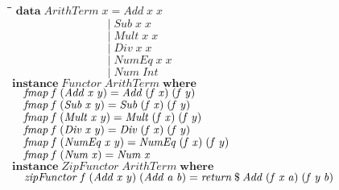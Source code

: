 \documentclass[10pt]{article}
\newlength{\lwidth}\setlength{\lwidth}{4.5cm}
\newlength{\cwidth}\setlength{\cwidth}{8mm} %
\newcommand{\Conid}[1]{\mathit{#1}}
\newcommand{\Varid}[1]{\mathit{#1}}
\begin{document}
\begin{tabbing}
\qquad\=\hspace{\lwidth}\=\hspace{\cwidth}\=\+\kill
${\mathbf{data}\;\Conid{ArithTerm}\;\Varid{x}\mathrel{=}\Conid{Add}\;\Varid{x}\;\Varid{x}}$\\
${\phantom{\mathbf{data}\;\Conid{ArithTerm}\;\Varid{x}\mbox{}}\mid \Conid{Sub}\;\Varid{x}\;\Varid{x}}$\\
${\phantom{\mathbf{data}\;\Conid{ArithTerm}\;\Varid{x}\mbox{}}\mid \Conid{Mult}\;\Varid{x}\;\Varid{x}}$\\
${\phantom{\mathbf{data}\;\Conid{ArithTerm}\;\Varid{x}\mbox{}}\mid \Conid{Div}\;\Varid{x}\;\Varid{x}}$\\
${\phantom{\mathbf{data}\;\Conid{ArithTerm}\;\Varid{x}\mbox{}}\mid \Conid{NumEq}\;\Varid{x}\;\Varid{x}}$\\
${\phantom{\mathbf{data}\;\Conid{ArithTerm}\;\Varid{x}\mbox{}}\mid \Conid{Num}\;\Conid{Int}}$\\
${}$\\
${\mathbf{instance}\;\Conid{Functor}\;\Conid{ArithTerm}\;\mathbf{where}}$\\
${\hskip1.00em\relax\Varid{fmap}\;\Varid{f}\;(\Conid{Add}\;\Varid{x}\;\Varid{y})\mathrel{=}\Conid{Add}\;(\Varid{f}\;\Varid{x})\;(\Varid{f}\;\Varid{y})}$\\
${\hskip1.00em\relax\Varid{fmap}\;\Varid{f}\;(\Conid{Sub}\;\Varid{x}\;\Varid{y})\mathrel{=}\Conid{Sub}\;(\Varid{f}\;\Varid{x})\;(\Varid{f}\;\Varid{y})}$\\
${\hskip1.00em\relax\Varid{fmap}\;\Varid{f}\;(\Conid{Mult}\;\Varid{x}\;\Varid{y})\mathrel{=}\Conid{Mult}\;(\Varid{f}\;\Varid{x})\;(\Varid{f}\;\Varid{y})}$\\
${\hskip1.00em\relax\Varid{fmap}\;\Varid{f}\;(\Conid{Div}\;\Varid{x}\;\Varid{y})\mathrel{=}\Conid{Div}\;(\Varid{f}\;\Varid{x})\;(\Varid{f}\;\Varid{y})}$\\
${\hskip1.00em\relax\Varid{fmap}\;\Varid{f}\;(\Conid{NumEq}\;\Varid{x}\;\Varid{y})\mathrel{=}\Conid{NumEq}\;(\Varid{f}\;\Varid{x})\;(\Varid{f}\;\Varid{y})}$\\
${\hskip1.00em\relax\Varid{fmap}\;\Varid{f}\;(\Conid{Num}\;\Varid{x})\mathrel{=}\Conid{Num}\;\Varid{x}}$\\
${}$\\
${\mathbf{instance}\;\Conid{ZipFunctor}\;\Conid{ArithTerm}\;\mathbf{where}}$\\
${\hskip1.00em\relax\Varid{zipFunctor}\;\Varid{f}\;(\Conid{Add}\;\Varid{x}\;\Varid{y})\;(\Conid{Add}\;\Varid{a}\;\Varid{b})\mathrel{=}\Varid{return}\mathbin{\$}\Conid{Add}\;(\Varid{f}\;\Varid{x}\;\Varid{a})\;(\Varid{f}\;\Varid{y}\;\Varid{b})}$\\

\end{tabbing}
\end{document}
